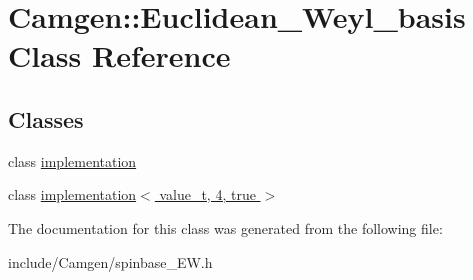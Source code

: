 \hypertarget{a00140}{}\section{Camgen\+:\+:Euclidean\+\_\+\+Weyl\+\_\+basis Class Reference}
\label{a00140}
\subsection*{Classes}
\begin{DoxyCompactItemize}
\item 
class \hyperlink{a00289}{implementation}
\item 
class \hyperlink{a00304}{implementation$<$ value\+\_\+t, 4, true $>$}
\end{DoxyCompactItemize}


The documentation for this class was generated from the following file\+:\begin{DoxyCompactItemize}
\item 
include/\+Camgen/spinbase\+\_\+\+E\+W.\+h\end{DoxyCompactItemize}
